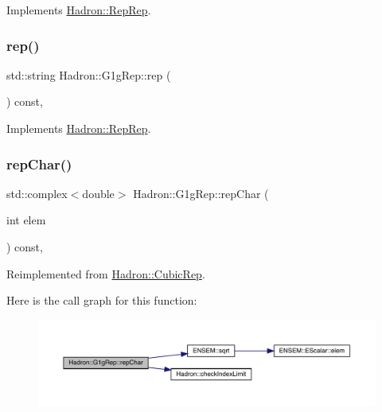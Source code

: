 Implements \mbox{\hyperlink{structHadron_1_1RepRep_ab3213025f6de249f7095892109575fde}{Hadron\+::\+Rep\+Rep}}.

\mbox{\label{structHadron_1_1G1gRep_ad03cbfd3310a65b26937f01ebaa044dd}} 
\subsubsection{\texorpdfstring{rep()}{rep()}\hspace{0.1cm}{\footnotesize\ttfamily [5/5]}}
{\footnotesize\ttfamily std\+::string Hadron\+::\+G1g\+Rep\+::rep (\begin{DoxyParamCaption}{ }\end{DoxyParamCaption}) const\hspace{0.3cm}{\ttfamily [inline]}, {\ttfamily [virtual]}}



Implements \mbox{\hyperlink{structHadron_1_1RepRep_ab3213025f6de249f7095892109575fde}{Hadron\+::\+Rep\+Rep}}.

\mbox{\label{structHadron_1_1G1gRep_aaf106033a828159337aed03c6489087f}} 
\subsubsection{\texorpdfstring{repChar()}{repChar()}\hspace{0.1cm}{\footnotesize\ttfamily [1/3]}}
{\footnotesize\ttfamily std\+::complex$<$double$>$ Hadron\+::\+G1g\+Rep\+::rep\+Char (\begin{DoxyParamCaption}\item[{int}]{elem }\end{DoxyParamCaption}) const\hspace{0.3cm}{\ttfamily [inline]}, {\ttfamily [virtual]}}



Reimplemented from \mbox{\hyperlink{structHadron_1_1CubicRep_af45227106e8e715e84b0af69cd3b36f8}{Hadron\+::\+Cubic\+Rep}}.

Here is the call graph for this function\+:
\nopagebreak
\begin{figure}[H]
\begin{center}
\leavevmode
\includegraphics[width=350pt]{d4/d3c/structHadron_1_1G1gRep_aaf106033a828159337aed03c6489087f_cgraph}
\end{center}
\end{figure}
\mbox{\label{structHadron_1_1G1gRep_aaf106033a828159337aed03c6489087f}} 

